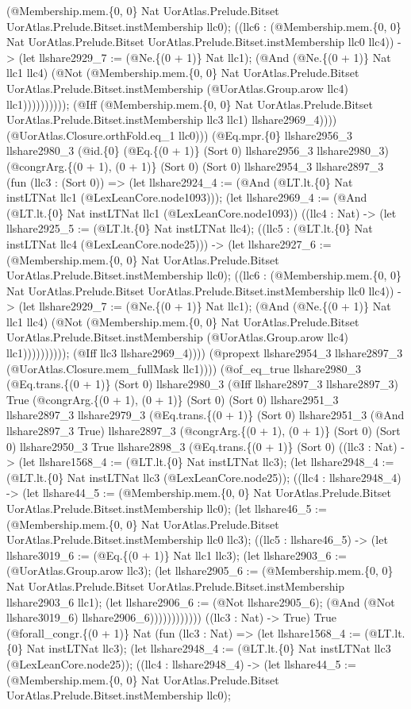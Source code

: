 \documentclass[11pt]{article}
\begin{document}
(@Membership.mem.\{0, 0\} Nat UorAtlas.Prelude.Bitset UorAtlas.Prelude.Bitset.instMembership llc0); ((llc6 : (@Membership.mem.\{0, 0\} Nat UorAtlas.Prelude.Bitset UorAtlas.Prelude.Bitset.instMembership llc0 llc4)) -> (let llshare2929\_7 := (@Ne.\{(0 + 1)\} Nat llc1); (@And (@Ne.\{(0 + 1)\} Nat llc1 llc4) (@Not (@Membership.mem.\{0, 0\} Nat UorAtlas.Prelude.Bitset UorAtlas.Prelude.Bitset.instMembership (@UorAtlas.Group.arow llc4) llc1)))))))))); (@Iff (@Membership.mem.\{0, 0\} Nat UorAtlas.Prelude.Bitset UorAtlas.Prelude.Bitset.instMembership llc3 llc1) llshare2969\_4)))) (@UorAtlas.Closure.orthFold.eq\_1 llc0))) (@Eq.mpr.\{0\} llshare2956\_3 llshare2980\_3 (@id.\{0\} (@Eq.\{(0 + 1)\} (Sort 0) llshare2956\_3 llshare2980\_3) (@congrArg.\{(0 + 1), (0 + 1)\} (Sort 0) (Sort 0) llshare2954\_3 llshare2897\_3 (fun (llc3 : (Sort 0)) => (let llshare2924\_4 := (@And (@LT.lt.\{0\} Nat instLTNat llc1 (@LexLeanCore.node1093))); (let llshare2969\_4 := (@And (@LT.lt.\{0\} Nat instLTNat llc1 (@LexLeanCore.node1093)) ((llc4 : Nat) -> (let llshare2925\_5 := (@LT.lt.\{0\} Nat instLTNat llc4); ((llc5 : (@LT.lt.\{0\} Nat instLTNat llc4 (@LexLeanCore.node25))) -> (let llshare2927\_6 := (@Membership.mem.\{0, 0\} Nat UorAtlas.Prelude.Bitset UorAtlas.Prelude.Bitset.instMembership llc0); ((llc6 : (@Membership.mem.\{0, 0\} Nat UorAtlas.Prelude.Bitset UorAtlas.Prelude.Bitset.instMembership llc0 llc4)) -> (let llshare2929\_7 := (@Ne.\{(0 + 1)\} Nat llc1); (@And (@Ne.\{(0 + 1)\} Nat llc1 llc4) (@Not (@Membership.mem.\{0, 0\} Nat UorAtlas.Prelude.Bitset UorAtlas.Prelude.Bitset.instMembership (@UorAtlas.Group.arow llc4) llc1)))))))))); (@Iff llc3 llshare2969\_4)))) (@propext llshare2954\_3 llshare2897\_3 (@UorAtlas.Closure.mem\_fullMask llc1)))) (@of\_eq\_true llshare2980\_3 (@Eq.trans.\{(0 + 1)\} (Sort 0) llshare2980\_3 (@Iff llshare2897\_3 llshare2897\_3) True (@congrArg.\{(0 + 1), (0 + 1)\} (Sort 0) (Sort 0) llshare2951\_3 llshare2897\_3 llshare2979\_3 (@Eq.trans.\{(0 + 1)\} (Sort 0) llshare2951\_3 (@And llshare2897\_3 True) llshare2897\_3 (@congrArg.\{(0 + 1), (0 + 1)\} (Sort 0) (Sort 0) llshare2950\_3 True llshare2898\_3 (@Eq.trans.\{(0 + 1)\} (Sort 0) ((llc3 : Nat) -> (let llshare1568\_4 := (@LT.lt.\{0\} Nat instLTNat llc3); (let llshare2948\_4 := (@LT.lt.\{0\} Nat instLTNat llc3 (@LexLeanCore.node25)); ((llc4 : llshare2948\_4) -> (let llshare44\_5 := (@Membership.mem.\{0, 0\} Nat UorAtlas.Prelude.Bitset UorAtlas.Prelude.Bitset.instMembership llc0); (let llshare46\_5 := (@Membership.mem.\{0, 0\} Nat UorAtlas.Prelude.Bitset UorAtlas.Prelude.Bitset.instMembership llc0 llc3); ((llc5 : llshare46\_5) -> (let llshare3019\_6 := (@Eq.\{(0 + 1)\} Nat llc1 llc3); (let llshare2903\_6 := (@UorAtlas.Group.arow llc3); (let llshare2905\_6 := (@Membership.mem.\{0, 0\} Nat UorAtlas.Prelude.Bitset UorAtlas.Prelude.Bitset.instMembership llshare2903\_6 llc1); (let llshare2906\_6 := (@Not llshare2905\_6); (@And (@Not llshare3019\_6) llshare2906\_6)))))))))))) ((llc3 : Nat) -> True) True (@forall\_congr.\{(0 + 1)\} Nat (fun (llc3 : Nat) => (let llshare1568\_4 := (@LT.lt.\{0\} Nat instLTNat llc3); (let llshare2948\_4 := (@LT.lt.\{0\} Nat instLTNat llc3 (@LexLeanCore.node25)); ((llc4 : llshare2948\_4) -> (let llshare44\_5 := (@Membership.mem.\{0, 0\} Nat UorAtlas.Prelude.Bitset UorAtlas.Prelude.Bitset.instMembership llc0); 
\end{document}
